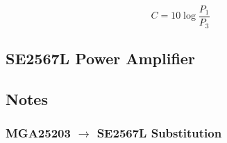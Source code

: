 \begin{equation}
        \label{eq:coupling-factor}
        C = 10 \log \frac{P_1}{P_3}
\end{equation}


\subsection{SE2567L Power Amplifier}
\label{sec:se2567l-power-amp}


\subsection{Notes}
\label{sec:notes}

\subsubsection{MGA25203 $\rightarrow$ SE2567L Substitution}
\label{sec:mga25203-se2567l-sub}

